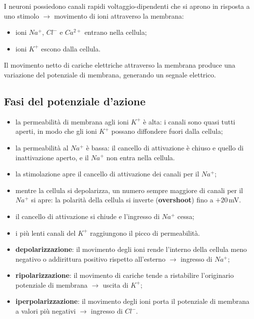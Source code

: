 I neuroni possiedono canali rapidi voltaggio-dipendenti che si aprono in risposta a uno stimolo $\rightarrow$ movimento di ioni attraverso la membrana:
\begin{itemize}
  \item ioni $Na^+$, $Cl^-$ e $Ca^{2+}$ entrano nella cellula;
  \item ioni $K^+$ escono dalla cellula.
\end{itemize}
Il movimento netto di cariche elettriche attraverso la membrana produce una variazione del potenziale di membrana, generando un segnale elettrico.

\subsection{Fasi del potenziale d'azione}

\begin{itemize}
  \item la permeabilità di membrana agli ioni $K^+$ è alta: i canali sono quasi tutti aperti, in modo che gli ioni $K^+$ possano diffondere fuori dalla cellula;
  \item la permeabilità al $Na^+$ è bassa: il cancello di attivazione è chiuso e quello di inattivazione aperto, e il $Na^+$ non entra nella cellula.
\end{itemize}

\begin{itemize}
  \item la stimolazione apre il cancello di attivazione dei canali per il $Na^+$;
  \item mentre la cellula si depolarizza, un numero sempre maggiore di canali per il $Na^+$ si apre: la polarità della cellula si inverte (\textbf{overshoot}) fino a $+20$\,mV.
\end{itemize}

\begin{itemize}
  \item il cancello di attivazione si chiude e l'ingresso di $Na^+$ cessa;
  \item i più lenti canali del $K^+$ raggiungono il picco di permeabilità.
\end{itemize}

\begin{itemize}
  \item \textbf{depolarizzazione}: il movimento degli ioni rende l'interno della cellula meno negativo o addirittura positivo rispetto all'esterno $\rightarrow$ ingresso di $Na^+$;
  \item \textbf{ripolarizzazione}: il movimento di cariche tende a ristabilire l'originario potenziale di membrana $\rightarrow$ uscita di $K^+$;
  \item \textbf{iperpolarizzazione}: il movimento degli ioni porta il potenziale di membrana a valori più negativi $\rightarrow$ ingresso di $Cl^-$.
\end{itemize}


